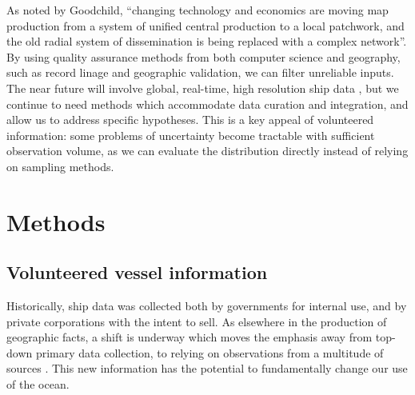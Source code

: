 \documentclass[12pt,letterpaper]{article}
\begin{document}
As noted by Goodchild, ``changing technology and economics are moving map production from a system of unified central production to a local patchwork, and the old radial system of dissemination is being replaced with a complex network''\citep{goodchild1999cartographic}. By using quality assurance methods from both computer science and geography, such as record linage and geographic validation, we can filter unreliable inputs. The near future will involve global, real-time, high resolution ship data \citep{JonesGoogle2012,carson2012satellite}, but we continue to need methods which accommodate data curation and integration, and allow us to address specific hypotheses. This is a key appeal of volunteered information: some problems of uncertainty become tractable with sufficient observation volume, as we can evaluate the distribution directly instead of relying on sampling methods.

\section{\textbf{Methods}}



\subsection{Volunteered vessel information}


Historically, ship data was collected both by governments for internal use, and by private corporations with the intent to sell. As elsewhere in the production of geographic facts, a shift is underway which moves the emphasis away from top-down primary data collection, to relying on observations from a multitude of sources \citep{goodchild2007citizens,elwood2011researching}. This new information has the potential to fundamentally change our use of the ocean.
\end{document}
